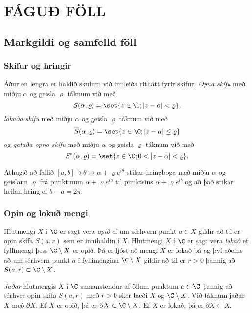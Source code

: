%
\chapter
{FÁGUÐ FÖLL}
 



\section{Markgildi og samfelld föll}

\subsection*{Skífur og hringir}

Áður en lengra er haldið skulum við innleiða rithátt fyrir skífur.  
{\it Opna skífu} með miðju $\alpha$ og geisla
$\varrho$ táknum við með
$$ S(\alpha,\varrho)=\set{z\in \C; |z-\alpha|<\varrho}, $$
{\it lokaða skífu} með miðju $\alpha$ og geisla 
$\varrho$ táknum við með
$$ \overline S(\alpha,\varrho)=\set{z\in \C; |z-\alpha|\leq\varrho} $$
og {\it gataða opna skífu} með miðju $\alpha$ og
geisla $\varrho$ táknum við með
$$ S^*(\alpha,\varrho)=\set{z\in \C; 0<|z-\alpha|<\varrho}. $$


Athugið að fallið $[a,b]\ni \theta\mapsto \alpha+\varrho e^{i\theta}$ stikar
hringboga með miðju $\alpha$ og geislann $\varrho$ frá punktinum
$\alpha+\varrho e^{ia}$
til punktsins $\alpha+\varrho e^{ib}$ og að það stikar heilan hring ef 
$b-a=2\pi$.

\subsection*{Opin og lokuð mengi}

Hlutmengi $X$ í $\C$ er sagt vera {\it opið} ef um sérhvern punkt $a\in X$
gildir að til er opin skífa $S(a,r)$ sem er innihaldin í $X$.
Hlutmengi  $X$ í $\C$ er sagt vera {\it lokað } ef fyllimengi þess
$\C\setminus X$ er opið.  Þá er ljóst að mengi $X$ er lokað þá og því
aðeins að um sérhvern punkt $a$ í fyllimenginu $\C\setminus X$ gildir
að til er $r>0$ þannig að $S(a,r)\subset \C\setminus X$.  


{\it Jaðar} hlutmengis $X$ í $\C$ samanstendur af öllum punktum
$a\in \C$ þannig að sérhver opin skífa $S(a,r)$ með $r>0$ sker bæði
$X$ og $\C\setminus X$.  Við táknum jaðar $X$ með $\partial X$.  
Ef $X$ er opið, þá er $\partial X\subset \C\setminus X$.
Ef $X$ er lokað, þá er $\partial X\subset X$.   

